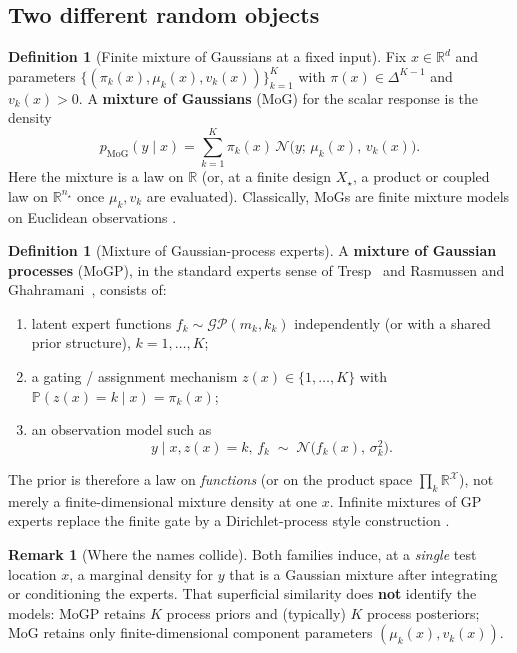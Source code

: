 \documentclass[11pt,a4paper]{article}
\theoremstyle{plain}
\theoremstyle{definition}
\newtheorem{definition}[theorem]{Definition}
\newtheorem{remark}[theorem]{Remark}
\theoremstyle{remark}
\newcommand{\R}{\mathbb{R}}
\newcommand{\Ncal}{\mathcal{N}}
\newcommand{\GP}{\mathcal{GP}}
\newcommand{\simplex}{\Delta}
\begin{document}
\subsection{Two different random objects}
\begin{definition}[Finite mixture of Gaussians at a fixed input]
\label{def:mog}
Fix \(x\in\R^d\) and parameters
\(\{(\pi_k(x),\mu_k(x),v_k(x))\}_{k=1}^{K}\) with
\(\pi(x)\in\simplex^{K-1}\) and \(v_k(x)>0\).
A \textbf{mixture of Gaussians} (MoG) for the scalar response is the density
\begin{equation}
  p_{\mathrm{MoG}}(y\mid x)
  =
  \sum_{k=1}^{K}
  \pi_k(x)\,
  \Ncal\!\bigl(y;\,\mu_k(x),\,v_k(x)\bigr).
  \label{eq:mog}
\end{equation}
Here the mixture is a law on \(\R\) (or, at a finite design \(X_\star\), a product or
coupled law on \(\R^{n_\star}\) once \(\mu_k,v_k\) are evaluated).
Classically, MoGs are finite mixture models on Euclidean observations
\citep{McLachlanPeel2000,Bishop2006}.
\end{definition}

\begin{definition}[Mixture of Gaussian-process experts]
\label{def:mogp}
A \textbf{mixture of Gaussian processes} (MoGP), in the standard experts sense of
Tresp~\citep{Tresp2001} and Rasmussen and Ghahramani~\citep{RasmussenGhahramani2001},
consists of:
\begin{enumerate}[label=(\roman*)]
  \item latent expert functions
        \(f_k\sim\GP(m_k,k_k)\) independently (or with a shared prior structure),
        \(k=1,\dots,K\);
  \item a gating / assignment mechanism \(z(x)\in\{1,\dots,K\}\) with
        \(\mathbb P(z(x)=k\mid x)=\pi_k(x)\);
  \item an observation model such as
        \[
          y\mid x,z(x)=k,\,f_k
          \;\sim\;
          \Ncal\!\bigl(f_k(x),\,\sigma_k^2\bigr).
        \]
\end{enumerate}
The prior is therefore a law on \emph{functions} (or on the product space
\(\prod_k \R^{\mathcal X}\)), not merely a finite-dimensional mixture density at one \(x\).
Infinite mixtures of GP experts replace the finite gate by a Dirichlet-process style
construction \citep{RasmussenGhahramani2001}.
\end{definition}

\begin{remark}[Where the names collide]
Both families induce, at a \emph{single} test location \(x\), a marginal density for \(y\)
that is a Gaussian mixture after integrating or conditioning the experts.
That superficial similarity does \textbf{not} identify the models: MoGP retains \(K\)
process priors and (typically) \(K\) process posteriors; MoG retains only finite-dimensional
component parameters \((\mu_k(x),v_k(x))\).
\end{remark}
\end{document}
